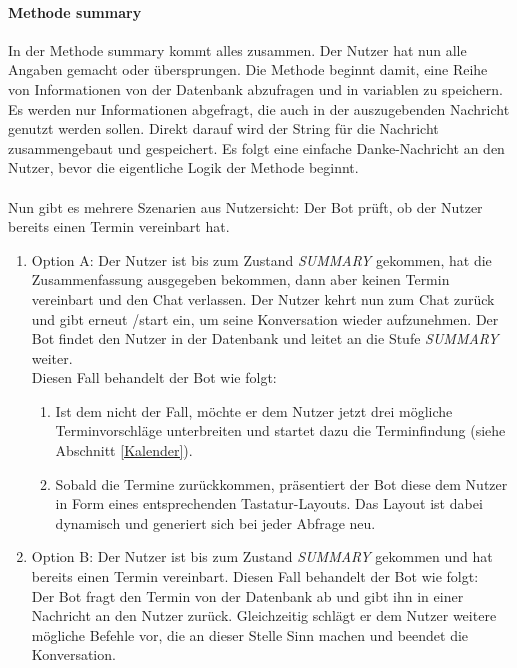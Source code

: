             \paragraph{Methode summary}
                In der Methode summary kommt alles zusammen. Der Nutzer hat nun alle Angaben gemacht oder übersprungen. Die Methode beginnt damit, eine Reihe von Informationen von der Datenbank abzufragen und in variablen zu speichern. Es werden nur Informationen abgefragt, die auch in der auszugebenden Nachricht genutzt werden sollen. Direkt darauf wird der String für die Nachricht zusammengebaut und gespeichert. Es folgt eine einfache Danke-Nachricht an den Nutzer, bevor die eigentliche Logik der Methode beginnt.\\
                \\
                Nun gibt es mehrere Szenarien aus Nutzersicht: Der Bot prüft, ob der Nutzer bereits einen Termin vereinbart hat.
                
                \begin{enumerate}
                \item Option A:  Der Nutzer ist bis zum Zustand \emph{SUMMARY} gekommen, hat die Zusammenfassung ausgegeben bekommen, dann aber keinen Termin vereinbart und den Chat verlassen. Der Nutzer kehrt nun zum Chat zurück und gibt erneut /start ein, um seine Konversation wieder aufzunehmen. Der Bot findet den Nutzer in der Datenbank und leitet an die Stufe \emph{SUMMARY} weiter. \\
                Diesen Fall behandelt der Bot wie folgt:
                    \begin{enumerate}
                        \item Ist dem nicht der Fall, möchte er dem Nutzer jetzt drei mögliche Terminvorschläge unterbreiten und startet dazu die Terminfindung (siehe Abschnitt \ref{Kalender}).
                        \item Sobald die Termine zurückkommen, präsentiert der Bot diese dem Nutzer in Form eines entsprechenden Tastatur-Layouts. Das Layout ist dabei dynamisch und generiert sich bei jeder Abfrage neu.
                    \end{enumerate}
                \item Option B: Der Nutzer ist bis zum Zustand \emph{SUMMARY} gekommen und hat bereits einen Termin vereinbart.
                Diesen Fall behandelt der Bot wie folgt:\\
                Der Bot fragt den Termin von der Datenbank ab und gibt ihn in einer Nachricht an den Nutzer zurück. Gleichzeitig schlägt er dem Nutzer weitere mögliche Befehle vor, die an dieser Stelle Sinn machen und beendet die Konversation.
                \end{enumerate}

